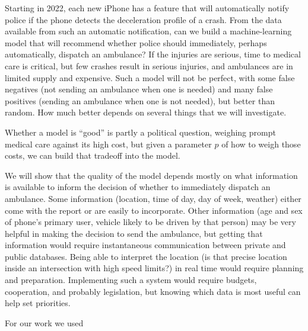 Starting in 2022, each new iPhone has a feature that will automatically notify police if the phone detects the deceleration profile of a crash.  From the data available from such an automatic notification, can we build a machine-learning model that will recommend whether police should immediately, perhaps automatically, dispatch an ambulance?  If the injuries are serious, time to medical care is critical, but few crashes result in serious injuries, and ambulances are in limited supply and expensive.  Such a model will not be perfect, with some false negatives (not sending an ambulance when one is needed) and many false positives (sending an ambulance when one is not needed), but better than random.  How much better depends on several things that we will investigate.

Whether a model is ``good'' is partly a political question, weighing prompt medical care against its high cost, but given a parameter $p$ of how to weigh those costs, we can build that tradeoff into the model.

We will show that the quality of the model depends mostly on what information is available to inform the decision of whether to immediately dispatch an ambulance.  Some information (location, time of day, day of week, weather) either come with the report or are easily to incorporate.  Other information (age and sex of phone's primary user, vehicle likely to be driven by that person) may be very helpful in making the decision to send the ambulance, but getting that information would require instantaneous communication between private and public databases.  Being able to interpret the location (is that precise location inside an intersection with high speed limits?) in real time would require planning and preparation.  Implementing such a system would require budgets, cooperation, and probably legislation, but knowing which data is most useful can help set priorities.  

For our work we used 